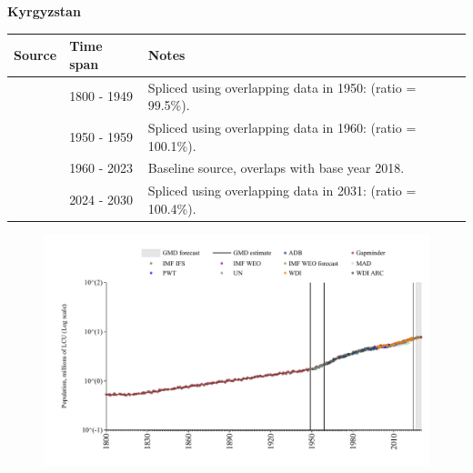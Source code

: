 \documentclass[12pt,a4paper,landscape]{article}
\begin{document}
\begin{adjustbox}{max totalsize={\paperwidth}{\paperheight},center}
\begin{minipage}[t][\textheight][t]{\textwidth}
\vspace*{0.5cm}
{}
\begin{center}
{\Large\bfseries Kyrgyzstan}
\end{center}
\vspace{0.5cm}
\begin{table}[H]
\centering
\small
\begin{tabular}{|l|l|l|}
\hline
\textbf{Source} & \textbf{Time span} & \textbf{Notes} \\
\hline
\rowcolor{white}\cite{Gapminder}& 1800 - 1949 &Spliced using overlapping data in 1950: (ratio = 99.5\%).\\
\rowcolor{lightgray}\cite{IMF_IFS}& 1950 - 1959 &Spliced using overlapping data in 1960: (ratio = 100.1\%).\\
\rowcolor{white}\cite{WDI}& 1960 - 2023 &Baseline source, overlaps with base year 2018.\\
\rowcolor{lightgray}\cite{Gapminder}& 2024 - 2030 &Spliced using overlapping data in 2031: (ratio = 100.4\%).\\
\hline
\end{tabular}
\end{table}
\begin{figure}[H]
\centering
\includegraphics[width=\textwidth,height=0.6\textheight,keepaspectratio]{graphs/KGZ_pop.pdf}
\end{figure}
\end{minipage}
\end{adjustbox}
\end{document}
